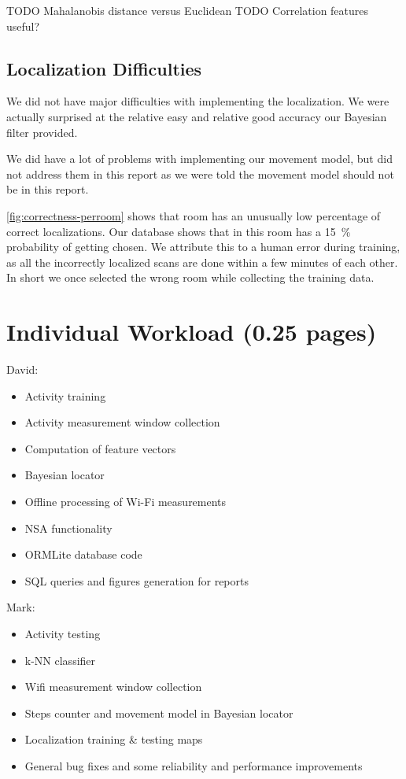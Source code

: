 \documentclass[a4paper,10pt,twoside]{IEEEtran}
\begin{document}
TODO Mahalanobis distance versus Euclidean
TODO Correlation features useful?

\subsection{Localization Difficulties}

We did not have major difficulties with implementing the localization.
We were actually surprised at the relative easy and relative good accuracy our Bayesian filter provided.

We did have a lot of problems with implementing our movement model, but did not address them in this report as we were told the movement model should not be in this report.

\autoref{fig:correctness-perroom} shows that room  has an unusually low percentage of correct localizations. Our database shows that in this room  has a 15~\% probability of getting chosen.
We attribute this to a human error during training, as all the incorrectly localized scans are done within a few minutes of each other.
In short we once selected the wrong room while collecting the training data.

\section{Individual Workload (0.25 pages)}
\label{sec:individual-workload}
David:
\begin{itemize}
    \item Activity training
    \item Activity measurement window collection
    \item Computation of feature vectors
    \item Bayesian locator
    \item Offline processing of Wi-Fi measurements
    \item NSA functionality
    \item ORMLite database code
    \item SQL queries and figures generation for reports
\end{itemize}

Mark:
\begin{itemize}
    \item Activity testing
    \item k-NN classifier
    \item Wifi measurement window collection
    \item Steps counter and movement model in Bayesian locator
    \item Localization training \& testing maps
    \item General bug fixes and some reliability and performance improvements
\end{itemize}
\end{document}
